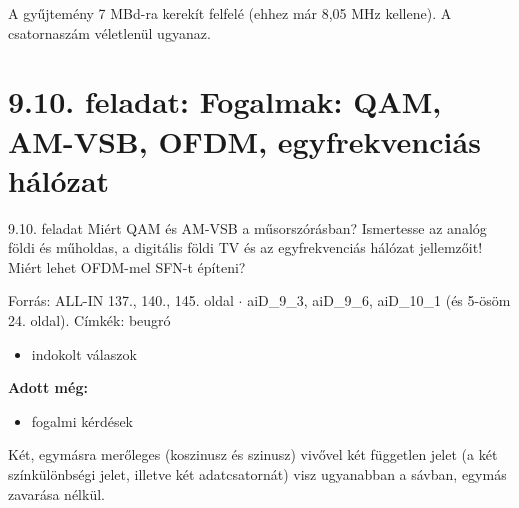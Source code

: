 \begin{center}\end{center}
\begin{figyelem}[Javítás]
A gyűjtemény 7 MBd-ra kerekít felfelé (ehhez már 8,05 MHz kellene). A csatornaszám véletlenül ugyanaz.
\end{figyelem}
\begin{eredmeny}

\begin{center}\end{center}
\end{eredmeny}


\section{\texorpdfstring{9.10. feladat: Fogalmak: QAM, AM-VSB, OFDM, egyfrekvenciás hálózat}{9.10. feladat: Fogalmak: QAM, AM-VSB, OFDM, egyfrekvenciás hálózat}}\label{ai9_10}
\setcounter{lepes}{0}
\begin{feladat}{9.10. feladat}
Miért QAM és AM-VSB a műsorszórásban? Ismertesse az analóg földi és műholdas, a digitális földi TV és az egyfrekvenciás hálózat jellemzőit! Miért lehet OFDM-mel SFN-t építeni?

{\footnotesize\sffamily Forrás: ALL-IN 137., 140., 145. oldal $\cdot$ aiD\_9\_3, aiD\_9\_6, aiD\_10\_1 (és 5-ösöm 24. oldal). Címkék: beugró}
\end{feladat}
\begin{keresunk}
\begin{itemize}
\item indokolt válaszok
\end{itemize}
\end{keresunk}
\begin{jeloles}
\par\smallskip\textbf{Adott még:}
\begin{itemize}
\item fogalmi kérdések
\end{itemize}
\end{jeloles}

Két, egymásra merőleges (koszinusz és szinusz) vivővel két független jelet (a két színkülönbségi jelet, illetve két adatcsatornát) visz ugyanabban a sávban, egymás zavarása nélkül.

